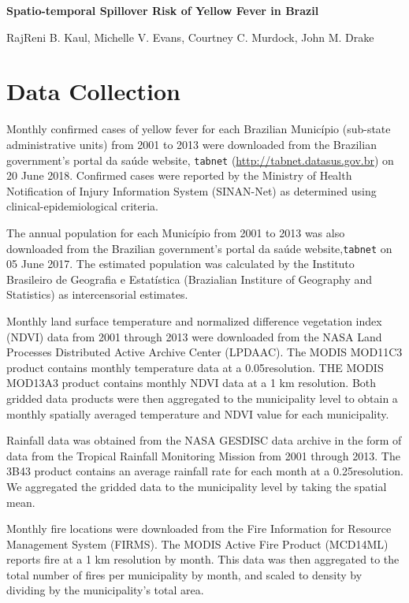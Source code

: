 \documentclass{article}
\begin{document}
\noindent
\textbf{\LARGE{Spatio-temporal Spillover Risk of Yellow Fever in Brazil}}

\bigskip
\noindent
RajReni B. Kaul, Michelle V. Evans, Courtney C. Murdock, John M. Drake
\smallskip

\tableofcontents

\newpage

\section*{Data Collection}

Monthly confirmed cases of yellow fever for each Brazilian Munic\'{i}pio (sub-state administrative units) from 2001 to 2013 were downloaded from the Brazilian government's portal da sa\'{u}de website, \texttt{tabnet} (\url{http://tabnet.datasus.gov.br}) on 20 June 2018.
Confirmed cases were reported by the Ministry of Health Notification of Injury Information System (SINAN-Net) as determined using clinical-epidemiological criteria.

The annual population for each Munic\'{i}pio from 2001 to 2013 was also downloaded from the Brazilian government's portal da sa\'{u}de website,\texttt{tabnet} on 05 June 2017. The estimated population was calculated by the Instituto Brasileiro de Geografia e Estat\'{i}stica (Brazialian Institure of Geography and Statistics) as intercensorial estimates.

Monthly land surface temperature and normalized difference vegetation index (NDVI) data from 2001 through 2013 were downloaded from the NASA Land Processes Distributed Active Archive Center (LPDAAC). The MODIS MOD11C3 product contains monthly temperature data at a 0.05\degree resolution. THE MODIS MOD13A3 product contains monthly NDVI data at a 1 km resolution. Both gridded data products were then aggregated to the municipality level to obtain a monthly spatially averaged temperature and NDVI value for each municipality.

Rainfall data was obtained from the NASA GESDISC data archive in the form of data from the Tropical Rainfall Monitoring Mission from 2001 through 2013. The 3B43 product contains an average rainfall rate for each month at a 0.25\degree resolution. We aggregated the gridded data to the municipality level by taking the spatial mean.

Monthly fire locations were downloaded from the Fire Information for Resource Management System (FIRMS). The MODIS Active Fire Product (MCD14ML) reports fire at a 1 km resolution by month. This data was then aggregated to the total number of fires per municipality by month, and scaled to density by dividing by the municipality's total area.
\end{document}
